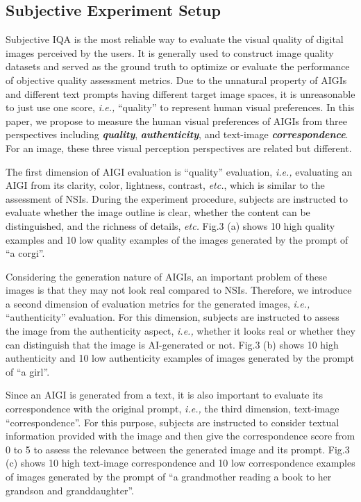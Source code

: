 \documentclass[runningheads]{llncs}
\begin{document}
\subsection{Subjective Experiment Setup}

Subjective IQA is the most reliable way to evaluate the visual quality of digital images perceived by the users. 
It is generally used to construct image quality datasets and served as the ground truth to optimize or evaluate the performance of objective quality assessment metrics. 
Due to the unnatural property of AIGIs and different text prompts having different target image spaces, it is unreasonable to just use one score, \textit{i.e.,} ``quality'' to represent human visual preferences.
In this paper, we propose to measure the human visual preferences of AIGIs from three perspectives including \textbf{\textit{quality}}, \textbf{\textit{authenticity}}, and text-image \textbf{\textit{correspondence}}.
For an image, these three visual perception perspectives are related but different.


The first dimension of AIGI evaluation is ``quality'' evaluation, \textit{i.e.,} evaluating an AIGI from its clarity, color, lightness, contrast, \textit{etc.}, which is similar to the assessment of NSIs.
During the experiment procedure, subjects are instructed to evaluate whether the image outline is clear, whether the content can be distinguished, and the richness of details, \textit{etc.} 
Fig.3 (a) shows 10 high quality examples and 10 low quality examples of the images generated by the prompt of “a corgi”.

Considering the generation nature of AIGIs, an important problem of these images is that they may not look real compared to NSIs.
Therefore, we introduce a second dimension of evaluation metrics for the generated images, \textit{i.e.,} ``authenticity'' evaluation.
For this dimension, subjects are instructed to assess the image from the authenticity aspect, \textit{i.e.,} whether it looks real or whether they can distinguish that the image is AI-generated or not. 
Fig.3 (b) shows 10 high authenticity and 10 low authenticity examples of images generated by the prompt of ``a girl''.

Since an AIGI is generated from a text, it is also important to evaluate its correspondence with the original prompt, \textit{i.e.,} the third dimension, text-image ``correspondence''. 
For this purpose, subjects are instructed to consider textual information provided with the image and then give the correspondence score from 0 to 5 to assess the relevance between the generated image and its prompt. 
Fig.3 (c) shows 10 high text-image correspondence and 10 low correspondence examples of images generated by the prompt of “a grandmother reading a book to her grandson and granddaughter''.

\vspace{-2pt}
\end{document}
